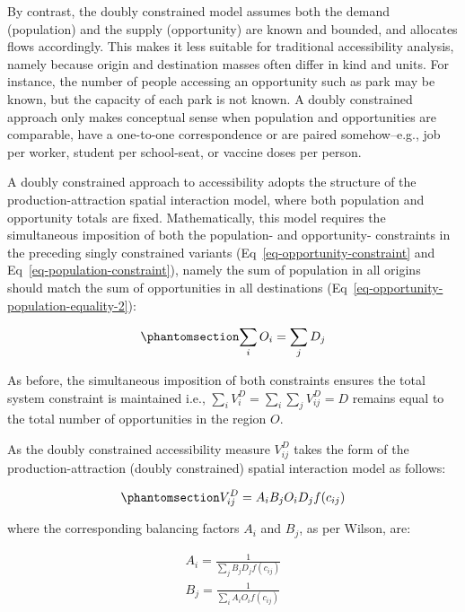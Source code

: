 \documentclass[
  10pt,
  letterpaper,
]{article}
\begin{document}
By contrast, the doubly constrained model assumes both the demand
(population) and the supply (opportunity) are known and bounded, and
allocates flows accordingly. This makes it less suitable for traditional
accessibility analysis, namely because origin and destination masses
often differ in kind and units. For instance, the number of people
accessing an opportunity such as park may be known, but the capacity of
each park is not known. A doubly constrained approach only makes
conceptual sense when population and opportunities are comparable, have
a one-to-one correspondence or are paired somehow--e.g., job per worker,
student per school-seat, or vaccine doses per person.

A doubly constrained approach to accessibility adopts the structure of
the production-attraction spatial interaction model, where both
population and opportunity totals are fixed. Mathematically, this model
requires the simultaneous imposition of both the population- and
opportunity- constraints in the preceding singly constrained variants
(Eq~\ref{eq-opportunity-constraint} and
Eq~\ref{eq-population-constraint}), namely the sum of population in all
origins should match the sum of opportunities in all destinations
(Eq~\ref{eq-opportunity-population-equality-2}):

\begin{equation}\phantomsection\label{eq-opportunity-population-equality-2}{
\sum_i O_i = \sum_j D_j
}\end{equation}

As before, the simultaneous imposition of both constraints ensures the
total system constraint is maintained i.e.,
\(\sum_i V^D_{i} = \sum_i\sum_j  V^D_{ij} = D\) remains equal to the
total number of opportunities in the region \(O\).

As the doubly constrained accessibility measure \(V_{ij}^D\) takes the
form of the production-attraction (doubly constrained) spatial
interaction model as follows:

\begin{equation}\phantomsection\label{eq-doubly-constrained-accessibility}{
V_{ij}^D = A_i B_j O_i D_j f(c_{ij})
}\end{equation}

\noindent where the corresponding balancing factors \(A_i\) and \(B_j\),
as per Wilson, are:

\[
\begin{array}{l}
A_i = \frac{1}{\sum_j B_j D_j f(c_{ij})}\\
B_j = \frac{1}{\sum_i A_i O_i f(c_{ij})}
\end{array}
\]
\end{document}
